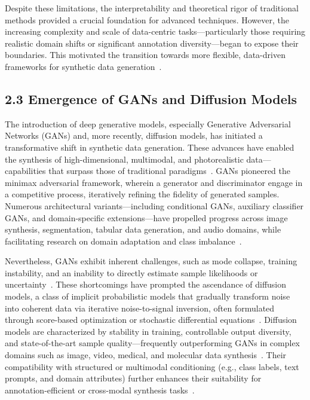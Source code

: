 \documentclass[11pt]{article}
\begin{document}
Despite these limitations, the interpretability and theoretical rigor of traditional methods provided a crucial foundation for advanced techniques. However, the increasing complexity and scale of data-centric tasks—particularly those requiring realistic domain shifts or significant annotation diversity—began to expose their boundaries. This motivated the transition towards more flexible, data-driven frameworks for synthetic data generation~\cite{13,64,81}.

\subsection{2.3 Emergence of GANs and Diffusion Models}

The introduction of deep generative models, especially Generative Adversarial Networks (GANs) and, more recently, diffusion models, has initiated a transformative shift in synthetic data generation. These advances have enabled the synthesis of high-dimensional, multimodal, and photorealistic data—capabilities that surpass those of traditional paradigms~\cite{1,2,3,5,6,10,12,13,14,15,16,18,21,22,24,25,26,64,75,81,82,89,90}. GANs pioneered the minimax adversarial framework, wherein a generator and discriminator engage in a competitive process, iteratively refining the fidelity of generated samples. Numerous architectural variants—including conditional GANs, auxiliary classifier GANs, and domain-specific extensions—have propelled progress across image synthesis, segmentation, tabular data generation, and audio domains, while facilitating research on domain adaptation and class imbalance~\cite{10,12,13,14,26,75,81,90}.

Nevertheless, GANs exhibit inherent challenges, such as mode collapse, training instability, and an inability to directly estimate sample likelihoods or uncertainty~\cite{5,13,75,90}. These shortcomings have prompted the ascendance of diffusion models, a class of implicit probabilistic models that gradually transform noise into coherent data via iterative noise-to-signal inversion, often formulated through score-based optimization or stochastic differential equations~\cite{10,16,21,22,23,24,25,75,81,82,89}. Diffusion models are characterized by stability in training, controllable output diversity, and state-of-the-art sample quality—frequently outperforming GANs in complex domains such as image, video, medical, and molecular data synthesis~\cite{21,24,25,75,81,89}. Their compatibility with structured or multimodal conditioning (e.g., class labels, text prompts, and domain attributes) further enhances their suitability for annotation-efficient or cross-modal synthesis tasks~\cite{21,23,24,82,89,90}.
\end{document}
